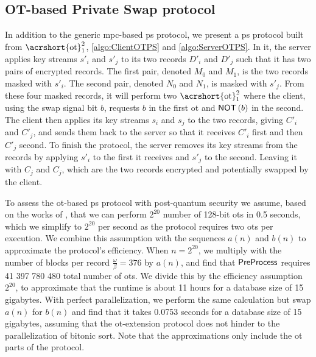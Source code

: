 \subsection*{\thesubsection\quad OT-based Private Swap protocol}\label{subsec:OTbasedPSprotocol}

In addition to the generic \acrshort{mpc}-based \acrshort{ps} protocol, we present a \acrshort{ps} protocol built from $\text{\acrshort{ot}}^2_1$, \cref{algo:ClientOTPS} and \cref{algo:ServerOTPS}. In it, the server applies key streams $ s'_i $ and $ s'_j $ to its two records $ D'_i $ and $ D'_j $ such that it has two pairs of encrypted records. The first pair, denoted $ M_0 $ and $ M_1 $, is the two records masked with $ s'_i $. The second pair, denoted $ N_0 $ and $ N_1 $, is masked with $ s'_j $. From these four masked records, it will perform two $\text{\acrshort{ot}}^2_1$ where the client, using the swap signal bit $ b $, requests $ b $ in the first \acrshort{ot} and $ \mathsf{{NOT}} \left( b \right) $ in the second. The client then applies its key streams $ s_i $ and $ s_j $ to the two records, giving $ C'_i $ and $ C'_j$, and sends them back to the server so that it receives $ C'_i $ first and then $ C'_j $ second. To finish the protocol, the server removes its key streams from the records by applying $ s'_i $ to the first it receives and $ s'_j $ to the second. Leaving it with $ C_j $ and $ C_j $, which are the two records encrypted and potentially swapped by the client.

To assess the \acrshort{ot}-based \acrshort{ps} protocol with post-quantum security we assume, based on the works of \cite{CCS:BCGIKRS19}, that we can perform $ 2^{20} $ number of 128-bit \acrshort{ot}s in 0.5 seconds, which we simplify to $ 2^{20} $ per second as the protocol requires two \acrshort{ot}s per execution. We combine this assumption with the sequences $ a(n) $ and $ b(n) $ to approximate the protocol's efficiency. When  $ n = 2^{20} $, we multiply with the number of blocks per record $ \frac{\omega}{\beta} = 376 $ by $ a(n) $, and find that $ \mathsf{{PreProcess}} $ requires 41 397 780 480 total number of \acrshort{ot}s. We divide this by the efficiency assumption $ 2^{20} $, to approximate that the runtime is about 11 hours for a database size of 15 gigabytes. With perfect parallelization, we perform the same calculation but swap $ a(n) $ for $ b(n) $ and find that it takes 0.0753 seconds for a database size of 15 gigabytes, assuming that the \acrshort{ot}-extension protocol does not hinder to the parallelization of bitonic sort. Note that the approximations only include the \acrshort{ot} parts of the protocol.

